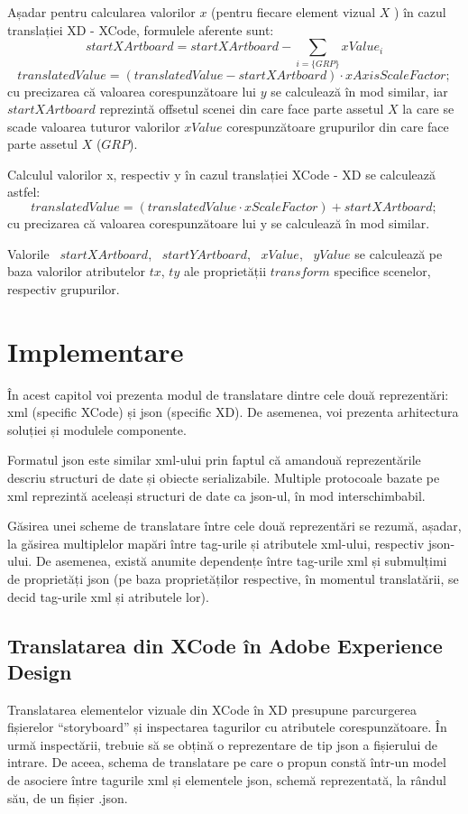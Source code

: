Așadar pentru calcularea valorilor $x$ (pentru fiecare element vizual $X$ ) în cazul translației XD - XCode, formulele aferente sunt:
        \[ startXArtboard = startXArtboard - \sum_{i = \{GRP\}} xValue_{i} \]
        \[ translatedValue = (translatedValue - {startXArtboard}) \cdot{xAxisScaleFactor};\]
cu precizarea că valoarea corespunzătoare lui $y$ se calculează în mod similar, iar ~$startXArtboard$ reprezintă offsetul scenei din care face parte assetul $X$ la care se scade valoarea tuturor valorilor $xValue$ corespunzătoare grupurilor din care face parte assetul $X$ ($GRP$). 

Calculul valorilor x, respectiv y în cazul translației XCode - XD se calculează astfel:
        \[ translatedValue = ({translatedValue} \cdot{xScaleFactor}) + startXArtboard; \]
cu precizarea că valoarea corespunzătoare lui y se calculează în mod similar.

Valorile ~$startXArtboard$, ~$startYArtboard$, ~$xValue$, ~$yValue$ se calculează pe baza valorilor atributelor $tx$, $ty$ ale proprietății $transform$ specifice scenelor, respectiv grupurilor.

\chapter{Implementare}

În acest capitol voi prezenta modul de translatare dintre cele două reprezentări: xml (specific XCode) și json (specific XD). De asemenea, voi prezenta arhitectura soluției și modulele componente.

Formatul json este similar xml-ului prin faptul că amandouă reprezentările descriu structuri de date și obiecte serializabile. Multiple protocoale bazate pe xml reprezintă aceleași structuri de date ca json-ul, în mod interschimbabil.

Găsirea unei scheme de translatare între cele două reprezentări se rezumă, așadar, la găsirea multiplelor mapări între tag-urile și atributele xml-ului, respectiv json-ului. De asemenea, există anumite dependențe între tag-urile xml și submulțimi de proprietăți json (pe baza proprietăților respective, în momentul translatării, se decid tag-urile xml și atributele lor).

\section{Translatarea din XCode în Adobe Experience Design} \label{xcode2xdv1}

Translatarea elementelor vizuale din XCode în XD presupune parcurgerea fișierelor “storyboard” și inspectarea tagurilor cu atributele corespunzătoare. În urmă inspectării, trebuie să se obțină o reprezentare de tip json a fișierului de intrare.  De aceea, schema de translatare pe care o propun constă într-un model de asociere între tagurile xml și elementele json, schemă reprezentată, la rândul său, de un fișier .json.  

